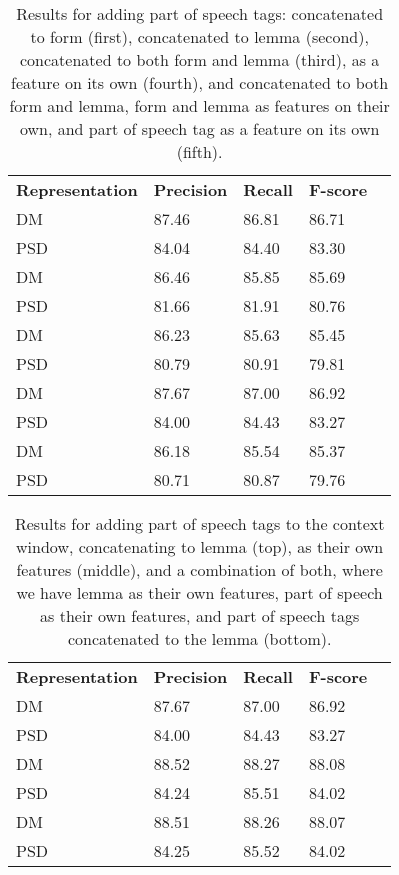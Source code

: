 
\begin{table}
    \centering
    \smaller[0.2]
    \begin{tabular}{@{}lllll@{}}
        \toprule
        \textbf{Representation} & \textbf{Precision} & \textbf{Recall} & \textbf{F-score} \\
        DM &  87.46 & 86.81 & 86.71 \\
        PSD & 84.04 & 84.40 & 83.30 \\
        \midrule
        DM &  86.46 & 85.85 & 85.69 \\
        PSD & 81.66 & 81.91 & 80.76 \\
        \midrule
        DM &  86.23 & 85.63 & 85.45 \\
        PSD & 80.79 & 80.91 & 79.81 \\
        \midrule
        DM &  87.67 & 87.00 & 86.92 \\
        PSD & 84.00 & 84.43 & 83.27 \\
        \midrule
        DM &  86.18 & 85.54 & 85.37 \\
        PSD & 80.71 & 80.87 & 79.76 \\
        \bottomrule
    \end{tabular}
    \caption{Results for adding part of speech tags: concatenated to form (first), concatenated to lemma (second), concatenated to both form and lemma (third), as a feature on its own (fourth), and concatenated to both form and lemma, form and lemma as features on their own, and part of speech tag as a feature on its own (fifth).}
    \label{table:pos}
\end{table}


\begin{table}
    \centering
    \smaller[0.2]
    \begin{tabular}{@{}lllll@{}}
        \toprule
        \textbf{Representation} & \textbf{Precision} & \textbf{Recall} & \textbf{F-score} \\
        DM &  87.67 & 87.00 & 86.92 \\
        PSD & 84.00 & 84.43 & 83.27 \\
        \midrule
        DM &  88.52 & 88.27 & 88.08 \\
        PSD & 84.24 & 85.51 & 84.02 \\
        \midrule
        DM &  88.51 & 88.26 & 88.07 \\
        PSD & 84.25 & 85.52 & 84.02 \\
        \bottomrule
    \end{tabular}
    \caption{Results for adding part of speech tags to the context window, concatenating to lemma (top), as their own features (middle), and a combination of both, where we have lemma as their own features, part of speech as their own features, and part of speech tags concatenated to the lemma (bottom).}
    \label{table:pos_context}
\end{table}

